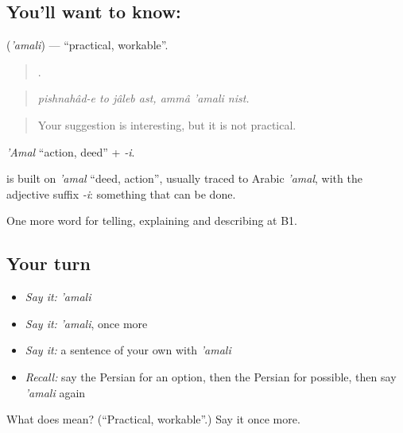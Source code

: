 \subsection*{You'll want to know: }
\textbf{} (\emph{'amali}) — \textquotedblleft{}practical, workable\textquotedblright{}.

\begin{quote}
      .
\end{quote}

\begin{quote}
\emph{pishnahâd-e to jâleb ast, ammâ 'amali nist.}
\end{quote}

\begin{quote}
Your suggestion is interesting, but it is not practical.
\end{quote}

\emph{'Amal} \textquotedblleft{}action, deed\textquotedblright{} + \emph{-i}.

\begin{cousinweb}
\textbf{} is built on \emph{'amal} \textquotedblleft{}deed, action\textquotedblright{}, usually traced to Arabic \emph{'amal}, with the adjective suffix \emph{-i}: something that can be done.
\end{cousinweb}

\begin{grammarlens}[title={What you've built}]
One more word for telling, explaining and describing at B1.
\end{grammarlens}

\subsection*{Your turn}
\begin{itemize}
\raggedright
  \item \emph{Say it:} \emph{'amali}
  \item \emph{Say it:} \emph{'amali}, once more
  \item \emph{Say it:} a sentence of your own with \emph{'amali}
  \item \emph{Recall:} say the Persian for an option, then the Persian for possible, then say \emph{'amali} again
\end{itemize}

\begin{tcolorbox}[breakable,colback=teal!4,colframe=teal!35!black,title={Before you move on}]
What does  mean? (\textquotedblleft{}Practical, workable\textquotedblright{}.) Say it once more.
\end{tcolorbox}
